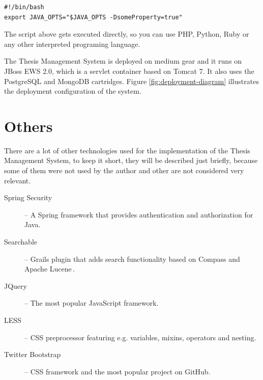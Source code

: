 \begin{verbatim}
#!/bin/bash
export JAVA_OPTS="$JAVA_OPTS -DsomeProperty=true"
\end{verbatim}

The script above gets executed directly, so you can use PHP, Python, Ruby or any other interpreted programing language.

The Thesis Management System is deployed on medium gear and it runs on JBoss EWS 2.0, which is a servlet container based on Tomcat 7. It also uses the PostgreSQL and MongoDB cartridges. Figure \ref{fig:deployment-diagram} illustrates the deployment configuration of the system.

\section{Others}

There are a lot of other technologies used for the implementation of the Thesis Management System, to keep it short, they will be described just briefly, because some of them were not used by the author and other are not considered very relevant.

\begin{description}
    \item[Spring Security] -- A Spring framework that provides authentication and authorization for Java.
    \item[Searchable] -- Grails plugin that adds search functionality based on Compass and Apache Lucene\,\cite{searchable-documentation}.
    \item[JQuery] -- The most popular JavaScript framework.
    \item[LESS] -- CSS preprocessor featuring e.g. variables, mixins, operators and nesting.
    \item[Twitter Bootstrap] -- CSS framework and the most popular project on GitHub.
\end{description}

